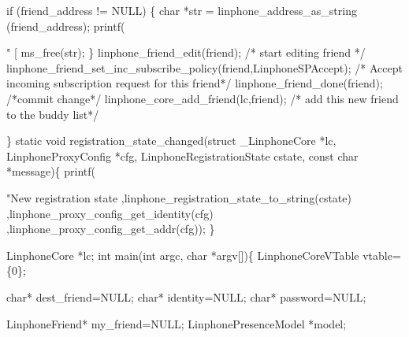 \begin{DoxyCodeInclude}
{        \textcolor{keywordflow}{if} (friend\_address != NULL) \{
                \textcolor{keywordtype}{char} *str = linphone_address_as_string (friend\_address);
                printf(\textcolor{stringliteral}{" [%
                ms\_free(str);
        \}
        linphone_friend_edit(\textcolor{keyword}{friend}); \textcolor{comment}{/* start editing friend */}
        linphone_friend_set_inc_subscribe_policy(\textcolor{keyword}{friend},LinphoneSPAccept); \textcolor{comment}{/* Accept incoming subscription
       request for this friend*/}
        linphone_friend_done(\textcolor{keyword}{friend}); \textcolor{comment}{/*commit change*/}
        linphone_core_add_friend(lc,\textcolor{keyword}{friend}); \textcolor{comment}{/* add this new friend to the buddy list*/}

\}
\textcolor{keyword}{static} \textcolor{keywordtype}{void} registration\_state\_changed(\textcolor{keyword}{struct} \_LinphoneCore *lc, 
      LinphoneProxyConfig *cfg, LinphoneRegistrationState cstate, \textcolor{keyword}{const} \textcolor{keywordtype}{char} *message)\{
                printf(\textcolor{stringliteral}{"New registration state %
                                ,linphone_registration_state_to_string(cstate)
                                ,linphone_proxy_config_get_identity(cfg)
                                ,linphone\_proxy\_config\_get\_addr(cfg));
\}

LinphoneCore *lc;
\textcolor{keywordtype}{int} main(\textcolor{keywordtype}{int} argc, \textcolor{keywordtype}{char} *argv[])\{
        LinphoneCoreVTable vtable=\{0\};

        \textcolor{keywordtype}{char}* dest\_friend=NULL;
        \textcolor{keywordtype}{char}* identity=NULL;
        \textcolor{keywordtype}{char}* password=NULL;

        LinphoneFriend* my\_friend=NULL;
        LinphonePresenceModel *model;

}}}
\end{DoxyCodeInclude}
